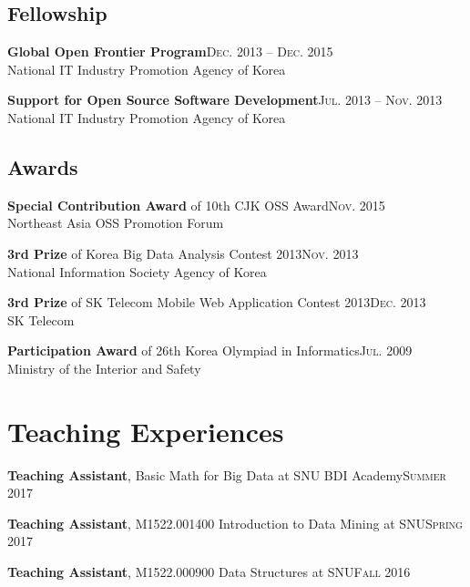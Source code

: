 \documentclass[11pt,a4paper]{article}
\renewenvironment{itemize}{
  \begin{list}{}{
    \setlength{\leftmargin}{1.5em}
    \setlength{\itemsep}{0.5em}
    \setlength{\parskip}{0pt}
    \setlength{\parsep}{0.25em}
  }
}{
  \end{list}
}
\begin{document}
\subsection*{Fellowship}
\begin{itemize}
  \item \textbf{Global Open Frontier Program}\hfill\textsc{Dec. 2013 -- Dec. 2015}\\
        National IT Industry Promotion Agency of Korea
  \item \textbf{Support for Open Source Software Development}\hfill\textsc{Jul. 2013 -- Nov. 2013}\\
        National IT Industry Promotion Agency of Korea
\end{itemize}
\subsection*{Awards}
\begin{itemize}
  \item \textbf{Special Contribution Award} of 10th CJK OSS Award\hfill\textsc{Nov. 2015}\\
        Northeast Asia OSS Promotion Forum
  \item \textbf{3rd Prize} of Korea Big Data Analysis Contest 2013\hfill\textsc{Nov. 2013}\\
        National Information Society Agency of Korea
  \item \textbf{3rd Prize} of SK Telecom Mobile Web Application Contest 2013\hfill\textsc{Dec. 2013}\\
        SK Telecom
  \item \textbf{Participation Award} of 26th Korea Olympiad in Informatics\hfill\textsc{Jul. 2009}\\
        Ministry of the Interior and Safety
\end{itemize}

\section*{Teaching Experiences}
\begin{itemize}
	\setlength\itemsep{0.1em}
	\item \textbf{Teaching Assistant}, Basic Math for Big Data at SNU BDI Academy\hfill\textsc{Summer 2017}
	\item \textbf{Teaching Assistant}, M1522.001400 Introduction to Data Mining at SNU\hfill\textsc{Spring 2017}
	\item \textbf{Teaching Assistant}, M1522.000900 Data Structures at SNU\hfill\textsc{Fall 2016}
\end{itemize}
\end{document}
